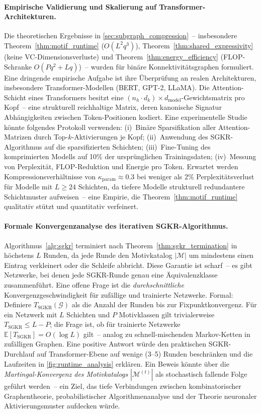 \documentclass[12pt, a4paper, openany]{report}
\newcommand{\E}{\mathbb{E}}
\newcommand{\calG}{\mathcal{G}}
\newcommand{\calM}{\mathcal{M}}
\begin{document}
\paragraph{Empirische Validierung und Skalierung auf Transformer-Architekturen.}
Die theoretischen Ergebnisse in \cref{sec:subgraph_compression}~-- insbesondere
Theorem~\ref{thm:motif_runtime} ($O(L^2 q^3)$),
Theorem~\ref{thm:shared_expressivity} (keine VC-Dimensionsverluste) und
Theorem~\ref{thm:energy_efficiency} (FLOP-Schranke $O(Pq^2 + Lq)$)~-- wurden
für binäre Konnektivitätsgraphen formuliert.  Eine dringende empirische
Aufgabe ist ihre Überprüfung an realen Architekturen, insbesondere
Transformer-Modellen (BERT, GPT-2, LLaMA).  Die Attention-Schicht eines
Transformers besitzt eine $(n_h \cdot d_k) \times d_{\mathrm{model}}$-Gewichts\-matrix
pro Kopf~-- eine strukturell reichhaltige Matrix, deren kanonische Signatur
Abhängigkeiten zwischen Token-Positionen kodiert.  Eine experimentelle
Studie könnte folgendes Protokoll verwenden: (i)~Binäre Sparsifikation aller
Attention-Matrizen durch Top-$k$-Aktivierungen je Kopf; (ii)~Anwendung
des SGKR-Algorithmus auf die sparsifizierten Schichten; (iii)~Fine-Tuning
des komprimierten Modells auf 10\% der ursprünglichen Trainingsdaten;
(iv)~Messung von Perplexität, FLOP-Reduktion und Energie pro Token.
Erwartet werden Kompressionsverhältnisse von
$\kappa_{\mathrm{param}} \approx 0.3$ bei weniger als 2\% Perplexitätsverlust
für Modelle mit $L \geq 24$ Schichten, da tiefere Modelle strukturell
redundantere Schichtmuster aufweisen~-- eine Empirie, die
Theorem~\ref{thm:motif_runtime} qualitativ stützt und quantitativ verfeinert.

\paragraph{Formale Konvergenzanalyse des iterativen SGKR-Algorithmus.}
Algorithmus~\ref{alg:sgkr} terminiert nach Theorem~\ref{thm:sgkr_termination}
in höchstens $L$ Runden, da jede Runde den Motivkatalog $|\calM|$ um mindestens
einen Eintrag verkleinert oder die Schleife abbricht.  Diese Garantie ist
scharf~-- es gibt Netzwerke, bei denen jede SGKR-Runde genau eine
Äquivalenzklasse zusammenführt.  Eine offene Frage ist die
\emph{durchschnittliche} Konvergenzgeschwindigkeit für zufällige und
trainierte Netzwerke.  Formal: Definiere $T_{\mathrm{SGKR}}(\calG)$ als die
Anzahl der Runden bis zur Fixpunktkonvergenz.  Für ein Netzwerk mit $L$
Schichten und $P$ Motivklassen gilt trivialerweise $T_{\mathrm{SGKR}} \leq
L - P$; die Frage ist, ob für trainierte Netzwerke
$\E[T_{\mathrm{SGKR}}] = O(\log L)$ gilt~-- analog zu schnell-mischenden
Markov-Ketten in zufälligen Graphen.  Eine positive Antwort würde den
praktischen SGKR-Durchlauf auf Transformer-Ebene auf wenige (3--5) Runden
beschränken und die Laufzeiten in \cref{fig:runtime_analysis} erklären.  Ein
Beweis könnte über die \emph{Martingal-Konvergenz des Motivkatalogs}
$|\calM^{(t)}|$ als stochastisch fallende Folge geführt werden~-- ein Ziel,
das tiefe Verbindungen zwischen kombinatorischer Graphentheorie,
probabilistischer Algorithmenanalyse und der Theorie neuronaler
Aktivierungsmuster aufdecken würde.
\end{document}
